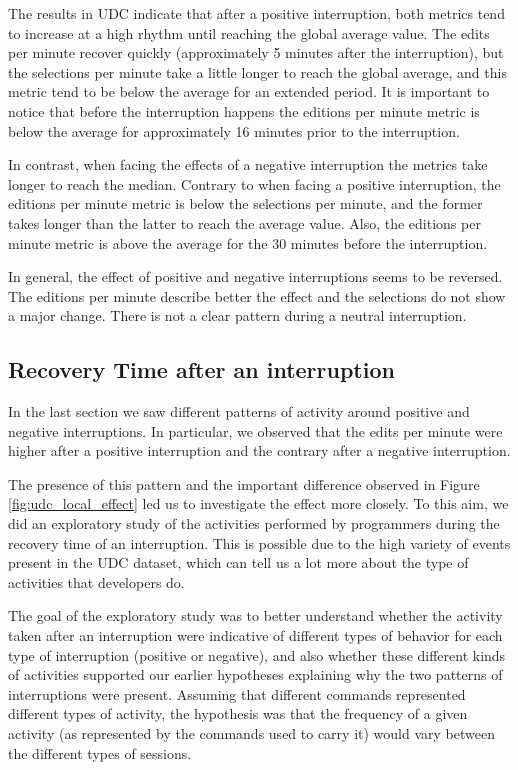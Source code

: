 \begin{table}[ht!]
\begin{tabular}{m{6cm} | m{6cm}}
		\\
	\end{tabular}
\end{table}

The results in UDC indicate that after a positive interruption, both metrics tend to increase at a high rhythm until reaching the global average value. The edits per minute recover quickly (approximately 5 minutes after the interruption), but the selections per minute take a little longer to reach the global average, and this metric tend to be below the average for an extended period. It is important to notice that before the interruption happens the editions per minute metric is below the average for approximately 16 minutes prior to the interruption.

In contrast, when facing the effects of a negative interruption the metrics take longer to reach the median. Contrary to when facing a positive interruption, the editions per minute metric is below the selections per minute, and the former takes longer than the latter to reach the average value. Also, the editions per minute metric is above the average for the 30 minutes before the interruption. 

In general, the effect of positive and negative interruptions seems to be reversed. The editions per minute describe better the effect and the selections do not show a major change. There is not a clear pattern during a neutral interruption.

\subsection{Recovery Time after an interruption}

In the last section we saw different patterns of activity around positive and negative interruptions. In particular, we observed that the edits per minute were higher after a positive interruption and the contrary after a negative interruption.

The presence of this pattern and the important difference observed in Figure \ref{fig:udc_local_effect} led us to investigate the effect more closely. To this aim, we did an exploratory study of the activities performed by programmers during the recovery time of an interruption. This is possible due to the high variety of events present in the UDC dataset, which can tell us a lot more about the type of activities that developers do.

The goal of the exploratory study was to better understand whether the activity taken after an interruption were indicative of different types of behavior for each type of interruption (positive or negative), and also whether these different kinds of activities supported our earlier hypotheses explaining why the two patterns of interruptions were present. Assuming that different commands represented different types of activity, the hypothesis was that the frequency of a given activity (as represented by the commands used to carry it) would vary between the different types of sessions.

